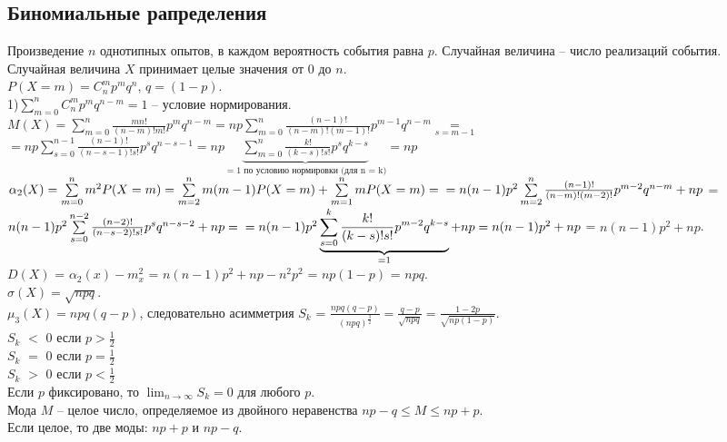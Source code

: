 \documentclass[russian, 12pt, fleqn,x11names]{article}
\begin{document}
\subsection{Биномиальные рапределения}
\noindent
Произведение $n$ однотипных опытов, в каждом вероятность события равна $p$. Случайная величина -- число реализаций события.\\
Случайная величина $X$ принимает целые значения от $0$ до $n$.\\
$P(X=m)=C^m_np^mq^n$, $q  = (1 - p)$.\\
1)$\sum\limits_{m=0}^{n}C_n^mp^mq^{n-m} = 1$ -- условие нормирования.\\
$\displaystyle{M(X) = \sum\limits_{m=0}^{n} \frac{mn!}{(n-m)!m!}p^mq^{n-m}= np\sum\limits_{m=0}^{n}\frac{(n-1)!}{(n-m)!(m-1)!}p^{m-1}q^{n-m} \underset{s = m - 1}{=}}$\\$= np\sum\limits_{s=0}^{n - 1} \frac{(n-1)!}{(n-s-1)!s!}p^sq^{n-s-1} = np \underbrace{\sum\limits_{m=0}^{n}\frac{k!}{(k-s)!s!}p^sq^{k-s}}_{=1   \textrm{ по условию нормировки (для n = k)}} = np$\\
$\alpha_2(X)=\sum\limits_{m=0}^{n}m^2P(X=m) = \sum\limits_{m=2}^{n} m(m-1)P(X=m) + \sum\limits_{m=1}^{n}mP(X=m)=\\= n(n-1)p^2\sum\limits_{m=2}^{n}\frac{(n-1)!}{(n-m)!(m-2)!}p^{m-2}q^{n-m} + np$ = $n(n-1)p^2\sum\limits_{s=0}^{n-2}\frac{(n-2)!}{(n-s-2)!s!}p^sq^{n-s-2}+np =\\= n(n-1)p^2 \underbrace{\sum\limits_{s = 0}^{k}\frac{k!}{(k-s)!s!}p^{m-2}q^{k-s}}_{=1} + np = n(n-1)p^2 + np$ = $n(n-1)p^2 + np$.\\
$D(X)$ = $\alpha_2(x) - m_x^2$ =  $n(n - 1)p^2 + np - n^2p^2$ = $np(1-p)$ = $npq$.\\
$\sigma(X) = \sqrt{npq}$.\\
$\mu_3(X) = npq(q-p)$, следовательно асимметрия $S_k$ = $\frac{npq(q-p)}{(npq)^{\frac{3}{2}}} = \frac{q-p}{\sqrt{npq}} = \frac{1-2p}{\sqrt{np(1-p)}}$.\\
$S_k$ $<$ $0$ если $p>\frac{1}{2}$\\
$S_k$ $=$ $0$ если $p=\frac{1}{2}$\\
$S_k$ $>$ $0$ если $p<\frac{1}{2}$\\
Если $p$ фиксировано, то $\displaystyle{ \lim_{n \to{ \infty}}}S_k = 0$ для любого $p$.\\
Мода $M$ -- целое число, определяемое из двойного неравенства $np-q \leq M \leq np + p$.\\
Если целое, то две моды: $np+p$ и $np-q$.\\
\end{document}
